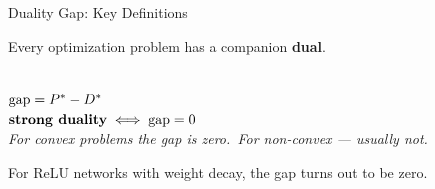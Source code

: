 
%
%
%
%
%
\begin{frame}{Duality Gap: Key Definitions}
  \begin{center}
    \vspace{0.4em}
    {\large Every optimization problem has a companion \textbf{dual}.}\\[1.2em]
    \\[1em]
    $\text{gap} = P^* - D^*$\\[0.5em]
    $\textbf{strong duality} \iff \text{gap} = 0$\\[1.2em]
    \textit{\small For convex problems the gap is zero.\ For non-convex --- usually not.}
  \end{center}
  \begin{block}{}
    \centering
    For ReLU networks with weight decay, the gap turns out to be zero.
  \end{block}
\end{frame}


